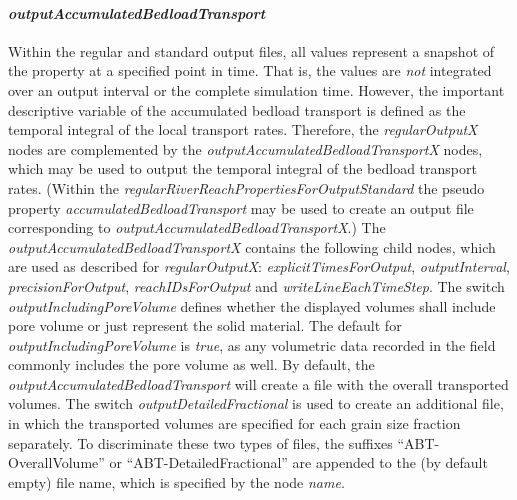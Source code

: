 \documentclass[11pt,a4paper]{article}
\begin{document}
\paragraph{\emph{outputAccumulatedBedloadTransport}}
Within the regular and standard output files, all values represent a snapshot of the property at a specified point in time. That is, the values are \emph{not} integrated over an output interval or the complete simulation time. However, the important descriptive variable of the accumulated bedload transport is defined as the temporal integral of the local transport rates. Therefore, the \emph{regularOutputX} nodes are complemented by the \emph{outputAccumulatedBedloadTransportX} nodes, which may be used to output the temporal integral of the bedload transport rates. (Within the \emph{regularRiverReachPropertiesForOutputStandard} the pseudo property \emph{accumulatedBedloadTransport} may be used to create an output file corresponding to \emph{outputAccumulatedBedloadTransportX}.) The \emph{outputAccumulatedBedloadTransportX} contains the following child nodes, which are used as described for \emph{regularOutputX}: \emph{explicitTimesForOutput}, \emph{outputInterval}, \emph{precisionForOutput}, \emph{reachIDsForOutput} and \emph{writeLineEachTimeStep}. The switch \emph{outputIncludingPoreVolume} defines whether the displayed volumes shall include pore volume or just represent the solid material. The default for \emph{outputIncludingPoreVolume} is \emph{true}, as any volumetric data recorded in the field commonly includes the pore volume as well. By default, the \emph{outputAccumulatedBedloadTransport} will create a file with the overall transported volumes. The switch \emph{outputDetailedFractional} is used to create an additional file, in which the transported volumes are specified for each grain size fraction separately. To discriminate these two types of files, the suffixes ``ABT-OverallVolume'' or ``ABT-DetailedFractional'' are appended to the (by default empty) file name, which is specified by the node \emph{name}.
\end{document}
